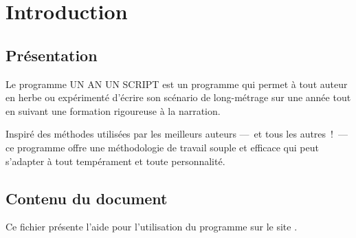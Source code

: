 \chapter{Introduction}\label{cha:introduction}

\section{Présentation}\label{presentationProgramme}

Le programme UN AN UN SCRIPT est un programme qui permet à tout auteur en herbe ou expérimenté d'écrire son scénario de long-métrage sur une année tout en suivant une formation rigoureuse à la narration.

Inspiré des méthodes utilisées par les meilleurs auteurs —~et tous les autres~!~— ce programme offre une méthodologie de travail souple et efficace qui peut s'adapter à tout tempérament et toute personnalité.

\section{Contenu du document}\label{sec:contenuDuDocument}

Ce fichier présente l'aide pour l'utilisation du programme \unan{} sur le site \boa{}.

